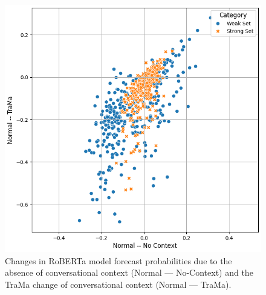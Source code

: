 \begin{figure}[ht]
    \centering
    \includegraphics[width=\linewidth]{figures/trama_results.png}
    \caption{
        Changes in RoBERTa model forecast probabilities due to the absence of conversational context (Normal --- No-Context) and the TraMa change of conversational context (Normal --- TraMa).}
    \label{fig:trama-results}
\end{figure}